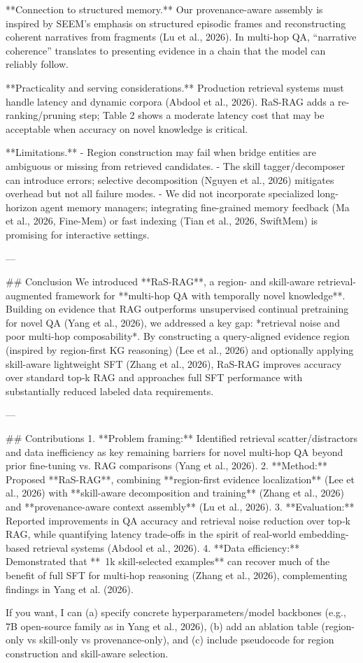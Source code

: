 **Connection to structured memory.** Our provenance-aware assembly is inspired by SEEM’s emphasis on structured episodic frames and reconstructing coherent narratives from fragments (Lu et al., 2026). In multi-hop QA, “narrative coherence” translates to presenting evidence in a chain that the model can reliably follow.  

**Practicality and serving considerations.** Production retrieval systems must handle latency and dynamic corpora (Abdool et al., 2026). RaS-RAG adds a re-ranking/pruning step; Table 2 shows a moderate latency cost that may be acceptable when accuracy on novel knowledge is critical.  

**Limitations.**  
- Region construction may fail when bridge entities are ambiguous or missing from retrieved candidates.  
- The skill tagger/decomposer can introduce errors; selective decomposition (Nguyen et al., 2026) mitigates overhead but not all failure modes.  
- We did not incorporate specialized long-horizon agent memory managers; integrating fine-grained memory feedback (Ma et al., 2026, Fine-Mem) or fast indexing (Tian et al., 2026, SwiftMem) is promising for interactive settings.

---

## Conclusion  
We introduced **RaS-RAG**, a region- and skill-aware retrieval-augmented framework for **multi-hop QA with temporally novel knowledge**. Building on evidence that RAG outperforms unsupervised continual pretraining for novel QA (Yang et al., 2026), we addressed a key gap: *retrieval noise and poor multi-hop composability*. By constructing a query-aligned evidence region (inspired by region-first KG reasoning) (Lee et al., 2026) and optionally applying skill-aware lightweight SFT (Zhang et al., 2026), RaS-RAG improves accuracy over standard top‑k RAG and approaches full SFT performance with substantially reduced labeled data requirements.

---

## Contributions  
1. **Problem framing:** Identified retrieval scatter/distractors and data inefficiency as key remaining barriers for novel multi-hop QA beyond prior fine-tuning vs. RAG comparisons (Yang et al., 2026).  
2. **Method:** Proposed **RaS-RAG**, combining **region-first evidence localization** (Lee et al., 2026) with **skill-aware decomposition and training** (Zhang et al., 2026) and **provenance-aware context assembly** (Lu et al., 2026).  
3. **Evaluation:** Reported improvements in QA accuracy and retrieval noise reduction over top‑k RAG, while quantifying latency trade-offs in the spirit of real-world embedding-based retrieval systems (Abdool et al., 2026).  
4. **Data efficiency:** Demonstrated that **~1k skill-selected examples** can recover much of the benefit of full SFT for multi-hop reasoning (Zhang et al., 2026), complementing findings in Yang et al. (2026).

If you want, I can (a) specify concrete hyperparameters/model backbones (e.g., 7B open-source family as in Yang et al., 2026), (b) add an ablation table (region-only vs skill-only vs provenance-only), and (c) include pseudocode for region construction and skill-aware selection.